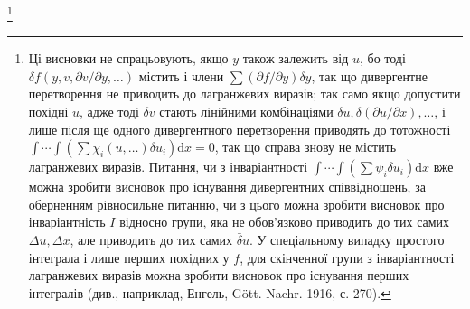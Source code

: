 \documentclass[11pt]{article}
\providecommand{\D}{\Delta}
\providecommand{\p}{\partial}
\providecommand{\dd}{\mathrm d}
\providecommand{\bd}{\bar{\delta}}
\begin{document}
\footnote{Ці висновки не спрацьовують, якщо \(y\) також залежить від \(u\), бо тоді \(\delta f(y,v,\p v/\p y,\ldots)\) містить і члени \(\sum(\p f/\p y)\delta y\), так що дивергентне перетворення не приводить до лагранжевих виразів; так само якщо допустити похідні \(u\), адже тоді \(\delta v\) стають лінійними комбінаціями \(\delta u,\delta(\p u/\p x),\ldots\), і лише після ще одного дивергентного перетворення приводять до тотожності \(\int\!\cdots\!\int(\sum\chi_i(u,\ldots)\delta u_i)\dd x=0\), так що справа знову не містить лагранжевих виразів. Питання, чи з інваріантності \(\int\!\cdots\!\int(\sum\psi_i\delta u_i)\dd x\) вже можна зробити висновок про існування дивергентних співвідношень, за оберненням рівносильне питанню, чи з цього можна зробити висновок про інваріантність \(I\) відносно групи, яка не обов'язково приводить до тих самих \(\D u,\D x\), але приводить до тих самих \(\bd u\). У спеціальному випадку простого інтеграла і лише перших похідних у \(f\), для скінченної групи з інваріантності лагранжевих виразів можна зробити висновок про існування перших інтегралів (див., наприклад, Енгель, Gött. Nachr. 1916, с. 270).}
\end{document}
